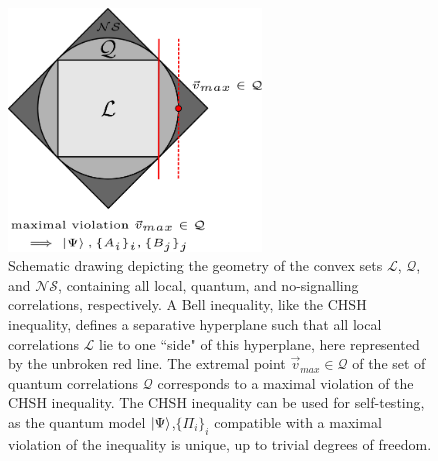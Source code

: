 \begin{figure}
    \centering
    \includegraphics[width=0.6\textwidth]{images/self-testingcorr.png}
    \caption{Schematic drawing depicting the geometry of the convex sets $\mathcal{L}$, $\mathcal{Q}$, and $\mathcal{NS}$, containing all local, quantum, and no-signalling correlations, respectively. A Bell inequality, like the CHSH inequality, defines a separative hyperplane such that all local correlations $\mathcal{L}$ lie to one ``side" of this hyperplane, here represented by the unbroken red line. The extremal point $\Vec{v}_{max}\in\mathcal{Q}$ of the set of quantum correlations $\mathcal{Q}$ corresponds to a maximal violation of the CHSH inequality. The CHSH inequality can be used for self-testing, as the quantum model $\ket{\Psi}$,$\{\Pi_i\}_i$ compatible with a maximal violation of the inequality is unique, up to trivial degrees of freedom.}
    \label{fig:selftestingcorr}
\end{figure}

